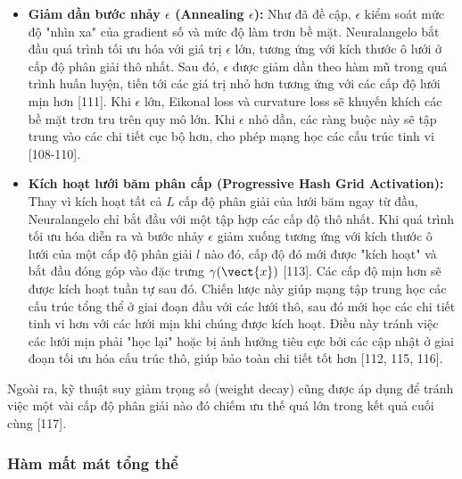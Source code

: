 \begin{itemize}
    \item \textbf{Giảm dần bước nhảy $\epsilon$ (Annealing $\epsilon$):} Như đã đề cập, $\epsilon$ kiểm soát mức độ "nhìn xa" của gradient số và mức độ làm trơn bề mặt. Neuralangelo bắt đầu quá trình tối ưu hóa với giá trị $\epsilon$ lớn, tương ứng với kích thước ô lưới ở cấp độ phân giải thô nhất. Sau đó, $\epsilon$ được giảm dần theo hàm mũ trong quá trình huấn luyện, tiến tới các giá trị nhỏ hơn tương ứng với các cấp độ lưới mịn hơn [111]. Khi $\epsilon$ lớn, Eikonal loss và curvature loss sẽ khuyến khích các bề mặt trơn tru trên quy mô lớn. Khi $\epsilon$ nhỏ dần, các ràng buộc này sẽ tập trung vào các chi tiết cục bộ hơn, cho phép mạng học các cấu trúc tinh vi [108-110].
    \item \textbf{Kích hoạt lưới băm phân cấp (Progressive Hash Grid Activation):} Thay vì kích hoạt tất cả $L$ cấp độ phân giải của lưới băm ngay từ đầu, Neuralangelo chỉ bắt đầu với một tập hợp các cấp độ thô nhất. Khi quá trình tối ưu hóa diễn ra và bước nhảy $\epsilon$ giảm xuống tương ứng với kích thước ô lưới của một cấp độ phân giải $l$ nào đó, cấp độ đó mới được "kích hoạt" và bắt đầu đóng góp vào đặc trưng $\gamma(\vect{x})$ [113]. Các cấp độ mịn hơn sẽ được kích hoạt tuần tự sau đó. Chiến lược này giúp mạng tập trung học các cấu trúc tổng thể ở giai đoạn đầu với các lưới thô, sau đó mới học các chi tiết tinh vi hơn với các lưới mịn khi chúng được kích hoạt. Điều này tránh việc các lưới mịn phải "học lại" hoặc bị ảnh hưởng tiêu cực bởi các cập nhật ở giai đoạn tối ưu hóa cấu trúc thô, giúp bảo toàn chi tiết tốt hơn [112, 115, 116].
\end{itemize}
Ngoài ra, kỹ thuật suy giảm trọng số (weight decay) cũng được áp dụng để tránh việc một vài cấp độ phân giải nào đó chiếm ưu thế quá lớn trong kết quả cuối cùng [117].

\subsubsection{Hàm mất mát tổng thể}
\label{subsubsec:neuralangelo_loss}

